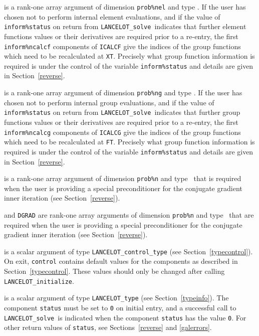 \documentclass{galahad}
\newcommand{\fullpackagename}{LANC\-E\-LOT}
\newcommand{\solver}{{\tt \fullpackagename\_solve}}
\begin{document}
\begin{description}
 is a rank-one \intentinout array argument of
dimension {\tt prob\%nel} and type \integer.
If the user has chosen not to perform internal element evaluations,
and if the value of {\tt inform\%status} on return from \solver\
indicates that further element functions values or their derivatives
are required prior to a re-entry,
the first {\tt inform\%ncalcf} components of {\tt ICALCF} give the
indices of the group functions which need to be
recalculated at {\tt XT}.
Precisely what group function information
is required is under the control of the
variable {\tt inform\%status} and details are given in Section~\ref{reverse}.

 is a rank-one \intentinout array argument of
dimension {\tt prob\%ng} and type \integer.
If the user has chosen not to perform internal group evaluations,
and if the value of {\tt inform\%status} on return from \solver\
indicates that further group functions values or their derivatives
are required prior to a re-entry,
the first {\tt inform\%ncalcg} components of {\tt ICALCG} give the
indices of the group functions which need to be
recalculated at {\tt FT}.
Precisely what group function information
is required is under the control of the
variable {\tt inform\%status} and details are given in Section~\ref{reverse}.

\itt{IVAR} is a rank-one \intentinout array argument of
dimension {\tt prob\%n} and type \integer\, that is
required when the user is providing a special preconditioner
for the conjugate gradient inner iteration (see Section~\ref{reverse}).

\itt{Q} and {\tt DGRAD} are rank-one \intentinout array arguments of
dimension {\tt prob\%n} and type \realdp\, that are
required when the user is providing a special preconditioner
for the conjugate gradient inner iteration
(see Section~\ref{reverse}).

 is a scalar \intentinout argument of type
{\tt \fullpackagename\_control\_type}
(see Section~\ref{typecontrol}). On exit, {\tt control} contains default
values for the components as described in Section~\ref{typecontrol}.
These values should only be changed after calling
{\tt \fullpackagename\_initialize}.

 is a scalar \intentinout argument of type
{\tt \fullpackagename\_type}
(see Section~\ref{typeinfo}). The component {\tt status} must be set to
{\tt 0} on initial entry, and a successful call to
\solver\ is indicated when the  component {\tt status} has the value {\tt 0}.
For other return values of {\tt status}, see Sections~\ref{reverse} and
\ref{galerrors}.


\end{description}
\end{document}

